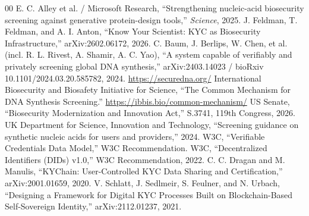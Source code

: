\documentclass[conference]{IEEEtran}
\begin{document}
\begin{thebibliography}{00}
 E. C. Alley et al. / Microsoft Research, ``Strengthening nucleic-acid
biosecurity screening against generative protein-design tools,'' \textit{Science}, 2025.
 J. Feldman, T. Feldman, and A. I. Anton, ``Know Your Scientist: KYC as Biosecurity
Infrastructure,'' arXiv:2602.06172, 2026.
 C. Baum, J. Berlips, W. Chen, et al. (incl. R. L. Rivest, A. Shamir,
A. C. Yao), ``A system capable of verifiably and privately screening global DNA synthesis,''
arXiv:2403.14023 / bioRxiv 10.1101/2024.03.20.585782, 2024. \url{https://securedna.org/}
 International Biosecurity and Biosafety Initiative for Science, ``The Common
Mechanism for DNA Synthesis Screening.'' \url{https://ibbis.bio/common-mechanism/}
 US Senate, ``Biosecurity Modernization and Innovation Act,'' S.3741, 119th
Congress, 2026.
 UK Department for Science, Innovation and Technology, ``Screening guidance on
synthetic nucleic acids for users and providers,'' 2024.
 W3C, ``Verifiable Credentials Data Model,'' W3C Recommendation.
 W3C, ``Decentralized Identifiers (DIDs) v1.0,'' W3C Recommendation, 2022.
 C. C. Dragan and M. Manulis, ``KYChain: User-Controlled KYC Data Sharing and
Certification,'' arXiv:2001.01659, 2020.
 V. Schlatt, J. Sedlmeir, S. Feulner, and N. Urbach, ``Designing a Framework for
Digital KYC Processes Built on Blockchain-Based Self-Sovereign Identity,'' arXiv:2112.01237, 2021.
\end{thebibliography}
\end{document}
